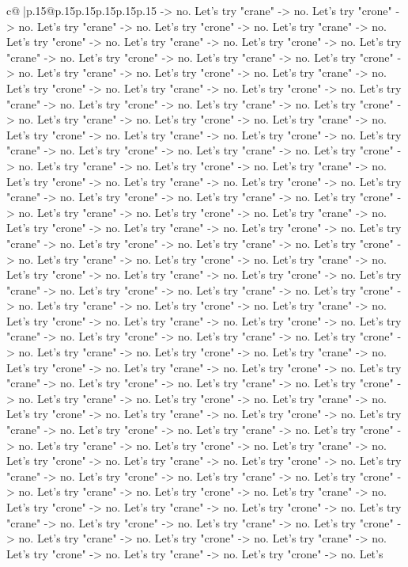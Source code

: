 \documentclass{article}
\begin{document}
{\begin{supertabular}{c@{$\;$}|p{.15\linewidth}@{}p{.15\linewidth}p{.15\linewidth}p{.15\linewidth}p{.15\linewidth}p{.15\linewidth}}
{{{{-}> no. Let's try "crane" {-}> no. Let's try "crone" {-}> no. Let's try "crane" {-}> no. Let's try "crone" {-}> no. Let's try "crane" {-}> no. Let's try "crone" {-}> no. Let's try "crane" {-}> no. Let's try "crone" {-}> no. Let's try "crane" {-}> no. Let's try "crone" {-}> no. Let's try "crane" {-}> no. Let's try "crone" {-}> no. Let's try "crane" {-}> no. Let's try "crone" {-}> no. Let's try "crane" {-}> no. Let's try "crone" {-}> no. Let's try "crane" {-}> no. Let's try "crone" {-}> no. Let's try "crane" {-}> no. Let's try "crone" {-}> no. Let's try "crane" {-}> no. Let's try "crone" {-}> no. Let's try "crane" {-}> no. Let's try "crone" {-}> no. Let's try "crane" {-}> no. Let's try "crone" {-}> no. Let's try "crane" {-}> no. Let's try "crone" {-}> no. Let's try "crane" {-}> no. Let's try "crone" {-}> no. Let's try "crane" {-}> no. Let's try "crone" {-}> no. Let's try "crane" {-}> no. Let's try "crone" {-}> no. Let's try "crane" {-}> no. Let's try "crone" {-}> no. Let's try "crane" {-}> no. Let's try "crone" {-}> no. Let's try "crane" {-}> no. Let's try "crone" {-}> no. Let's try "crane" {-}> no. Let's try "crone" {-}> no. Let's try "crane" {-}> no. Let's try "crone" {-}> no. Let's try "crane" {-}> no. Let's try "crone" {-}> no. Let's try "crane" {-}> no. Let's try "crone" {-}> no. Let's try "crane" {-}> no. Let's try "crone" {-}> no. Let's try "crane" {-}> no. Let's try "crone" {-}> no. Let's try "crane" {-}> no. Let's try "crone" {-}> no. Let's try "crane" {-}> no. Let's try "crone" {-}> no. Let's try "crane" {-}> no. Let's try "crone" {-}> no. Let's try "crane" {-}> no. Let's try "crone" {-}> no. Let's try "crane" {-}> no. Let's try "crone" {-}> no. Let's try "crane" {-}> no. Let's try "crone" {-}> no. Let's try "crane" {-}> no. Let's try "crone" {-}> no. Let's try "crane" {-}> no. Let's try "crone" {-}> no. Let's try "crane" {-}> no. Let's try "crone" {-}> no. Let's try "crane" {-}> no. Let's try "crone" {-}> no. Let's try "crane" {-}> no. Let's try "crone" {-}> no. Let's try "crane" {-}> no. Let's try "crone" {-}> no. Let's try "crane" {-}> no. Let's try "crone" {-}> no. Let's try "crane" {-}> no. Let's try "crone" {-}> no. Let's try "crane" {-}> no. Let's try "crone" {-}> no. Let's try "crane" {-}> no. Let's try "crone" {-}> no. Let's try "crane" {-}> no. Let's try "crone" {-}> no. Let's try "crane" {-}> no. Let's try "crone" {-}> no. Let's try "crane" {-}> no. Let's try "crone" {-}> no. Let's try "crane" {-}> no. Let's try "crone" {-}> no. Let's try "crane" {-}> no. Let's try "crone" {-}> no. Let's try "crane" {-}> no. Let's try "crone" {-}> no. Let's try "crane" {-}> no. Let's try "crone" {-}> no. Let's try "crane" {-}> no. Let's try "crone" {-}> no. Let's try "crane" {-}> no. Let's try "crone" {-}> no. Let's try "crane" {-}> no. Let's try "crone" {-}> no. Let's try "crane" {-}> no. Let's try "crone" {-}> no. Let's try "crane" {-}> no. Let's try "crone" {-}> no. Let's try "crane" {-}> no. Let's try "crone" {-}> no. Let's try "crane" {-}> no. Let's try "crone" {-}> no. Let's try "crane" {-}> no. Let's try "crone" {-}> no. Let's try "crane" {-}> no. Let's try "crone" {-}> no. Let's try "crane" {-}> no. Let's try "crone" {-}> no. Let's }}}
\end{supertabular}}
\end{document}
